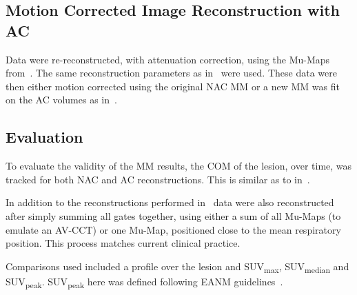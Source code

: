             \subsection{Motion Corrected Image Reconstruction with AC} \label{sec:pet_ct_respiratory_motion_correction_with_a_single_attenuation_map_using_nAC_derived_deformation_fields_methods_attenuation_corrected_image_reconstruction}
                Data were re-reconstructed, with attenuation correction, using the \glspl{Mu-Map} from~. The same reconstruction parameters as in~ were used. These data were then either motion corrected using the original \gls{NAC} \gls{MM} or a new \gls{MM} was fit on the \gls{AC} volumes as in~.
            
            \subsection{Evaluation} \label{sec:pet_ct_respiratory_motion_correction_with_a_single_attenuation_map_using_nAC_derived_deformation_fields_methods_evaluation}
                To evaluate the validity of the \gls{MM} results, the \gls{COM} of the lesion, over time, was tracked for both \gls{NAC} and \gls{AC} reconstructions. This is similar as to in~.
                
                In addition to the reconstructions performed in~ data were also reconstructed after simply summing all gates together, using either a sum of all \glspl{Mu-Map} (to emulate an \gls{AV-CCT}) or one \gls{Mu-Map}, positioned close to the mean respiratory position. This process matches current clinical practice. 
                
                Comparisons used included a profile over the lesion and \gls{SUV}\textsubscript{max}, \gls{SUV}\textsubscript{median} and \gls{SUV}\textsubscript{peak}. \gls{SUV}\textsubscript{peak} here was defined following \gls{EANM} guidelines~\parencite{Boellaard2015FDG2.0}.
            
